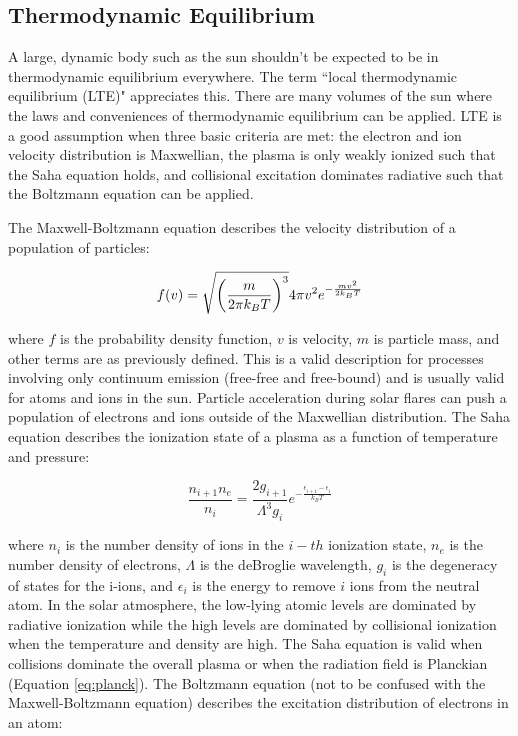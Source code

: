 \subsection{Thermodynamic Equilibrium} 
A large, dynamic body such as the sun shouldn't be expected to be in thermodynamic equilibrium everywhere. The term ``local thermodynamic equilibrium (LTE)" appreciates this. There are many volumes of the sun where the laws and conveniences of thermodynamic equilibrium can be applied. LTE is a good assumption when three basic criteria are met: the electron and ion velocity distribution is Maxwellian, the plasma is only weakly ionized such that the Saha equation holds, and collisional excitation dominates radiative such that the Boltzmann equation can be applied. 

The Maxwell-Boltzmann equation describes the velocity distribution of a population of particles: 

\begin{equation}
    \label{eq:maxwellboltzmann}
    f(v) = \sqrtsign{\left(\frac{m}{2\pi k_BT} \right)^3} 4\pi v^2 e^{-\frac{mv^2}{2k_BT}}
\end{equation}

\noindent where $f$ is the probability density function, $v$ is velocity, $m$ is particle mass, and other terms are as previously defined. This is a valid description for processes involving only continuum emission (free-free and free-bound) and is usually valid for atoms and ions in the sun. Particle acceleration during solar flares can push a population of electrons and ions outside of the Maxwellian distribution. The Saha equation describes the ionization state of a plasma as a function of temperature and pressure: 

\begin{equation}
    \label{eq:saha}
    \frac{n_{i+1}n_e}{n_i} = \frac{2g_{i+1}}{\Lambda^3 g_i} e^{-\frac{\epsilon_{i+1} - \epsilon_i}{k_BT}}
\end{equation}

\noindent where $n_i$ is the number density of ions in the $i-th$ ionization state, $n_e$ is the number density of electrons, $\Lambda$ is the deBroglie wavelength, $g_i$ is the degeneracy of states for the i-ions, and $\epsilon_i$ is the energy to remove $i$ ions from the neutral atom. In the solar atmosphere, the low-lying atomic levels are dominated by radiative ionization while the high levels are dominated by collisional ionization when the temperature and density are high. The Saha equation is valid when collisions dominate the overall plasma or when the radiation field is Planckian (Equation \ref{eq:planck}). The Boltzmann equation (not to be confused with the Maxwell-Boltzmann equation) describes the excitation distribution of electrons in an atom: 

